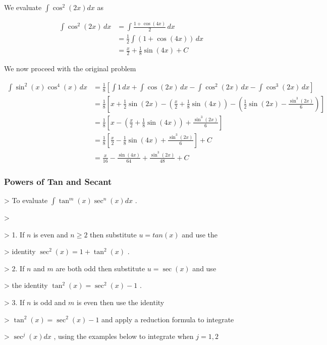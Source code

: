 We evaluate $\int \cos^2 (2x) dx$ as

\begin{align}
\int \cos^2 (2x)\, dx &= \int \frac{1 + \cos(4x)}{2}\, dx \\&= \frac{1}{2} \int (1 + \cos(4x))\, dx \\&= \frac{x}{2} + \frac{1}{8}\sin(4x) + C
\end{align}


We now proceed with the original problem

\begin{align}
\int \sin^2(x) \cos^4(x) \, dx &= \frac{1}{8} \left[\int 1 \, dx + \int \cos(2x) \, dx - \int \cos^2(2x) \, dx - \int \cos^3(2x) \, dx\right] \\&= \frac{1}{8} \left[x + \frac{1}{2}\sin(2x) - \left( \frac{x}{2} + \frac{1}{8}\sin(4x) \right) - \left( \frac{1}{2} \sin(2x) - \frac{\sin^3(2x)}{6} \right) \right] \\&= \frac{1}{8} \left[x - \left( \frac{x}{2} + \frac{1}{8}\sin(4x) \right) + \frac{\sin^3(2x)}{6} \right] \\&= \frac{1}{8} \left[\frac{x}{2} - \frac{1}{8}\sin(4x) + \frac{\sin^3(2x)}{6} \right] + C  \\&= \frac{x}{16} - \frac{\sin(4x)}{64} + \frac{\sin^3(2x)}{48} + C
\end{align}


\subsubsection{Powers of Tan and Secant}
\label{sss:powe-35bd}


> To evaluate $\int\tan^m(x)\sec^n(x)dx$ .

>

> 1.  If $n$ is even and $n\ge 2$ then substitute $u=tan(x)$ and use the

>     identity $\sec^2(x)=1+\tan^2(x)$ .

> 2.  If $n$ and $m$ are both odd then substitute $u=\sec(x)$ and use

>     the identity $\tan^2(x)=\sec^2(x)-1$ .

> 3.  If $n$ is odd and $m$ is even then use the identity

>     $\tan^2(x)=\sec^2(x)-1$ and apply a reduction formula to integrate

>     $\sec^j(x)dx$ , using the examples below to integrate when $j=1,2$

